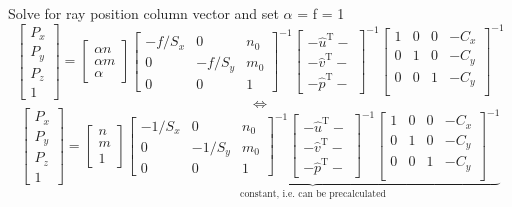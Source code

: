 Solve for ray position column vector and set $\alpha$ = f = 1
\[
\begin{bmatrix}
	P_x \\
	P_y \\
	P_z	\\
	1
\end{bmatrix}
=
\begin{bmatrix}
	\alpha n	\\
	\alpha m	\\
	\alpha
\end{bmatrix}
\begin{bmatrix}
   -f/S_x		 	& 0 		& n_0 	\\
   0 				& -f/S_y    & m_0	\\
   0           		& 0 		& 1
\end{bmatrix}^{-1}
\begin{bmatrix}
	- \hat{u}^\mathrm{T} -	\\
	- \hat{v}^\mathrm{T} -	\\
	- \hat{p}^\mathrm{T} -
\end{bmatrix}^{-1}
\begin{bmatrix}
	1 & 0 & 0 & -C_x	\\
	0 & 1 & 0 & -C_y	\\
	0 & 0 & 1 & -C_y	\\
\end{bmatrix}^{-1}
\]
\[
\iff
\]
\[
\begin{bmatrix}
	P_x \\
	P_y \\
	P_z	\\
	1
\end{bmatrix}
=
\begin{bmatrix}
	n	\\
	m	\\
	1
\end{bmatrix}
\underbrace{
\begin{bmatrix}
   -1/S_x		 	& 0 		& n_0 	\\
   0 				& -1/S_y    & m_0	\\
   0           		& 0 		& 1
\end{bmatrix}^{-1}
\begin{bmatrix}
	- \hat{u}^\mathrm{T} -	\\
	- \hat{v}^\mathrm{T} -	\\
	- \hat{p}^\mathrm{T} -
\end{bmatrix}^{-1}
\begin{bmatrix}
	1 & 0 & 0 & -C_x	\\
	0 & 1 & 0 & -C_y	\\
	0 & 0 & 1 & -C_y	\\
\end{bmatrix}^{-1}
}_{\mbox{constant, i.e. can be precalculated}}
\]
\cite{Borman03raytracingand}
